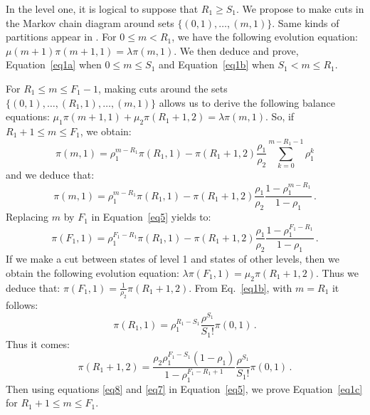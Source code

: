 \documentclass[conference]{IEEEtran}
\begin{document}
\begin{IEEEproof}
In the level one, it is logical to suppose that $R_1 \geq S_1$.
We propose to make cuts  in the Markov chain diagram around sets
$\{(0,1), \ldots, (m,1)\}$. Same kinds of partitions appear in \cite{mitrani2013managing}.
For $0 \leq m < R_1$, we have the following evolution equation: $\mu(m+1) \pi(m+1,1)= \lambda \pi(m,1)$.
We then deduce and prove, Equation~\eqref{eq1a} when $0 \leq m \leq S_1$ and
Equation~\eqref{eq1b} when $S_1<  m \leq R_1$.

For $R_1 \leq m \leq   F_1-1$, making cuts around the sets $\{(0,1), \ldots,(R_1,1), \ldots, (m,1)\}$ allows us to derive
the following balance equations: $\mu_1 \pi(m+1,1) + \mu_2 \pi(R_1+1,2)  = \lambda \pi(m,1)$. So, if $R_1+1 \leq m \leq   F_1$, we obtain:
\begin{equation}
\pi(m,1)=\rho_1^{m-R_1} \pi(R_1,1)-\pi(R_1+1,2)\frac{\rho_1}{\rho_2}\sum_{k=0}^{m-R_1-1} \rho_1^k \label{eq4}
\end{equation}
and we deduce that:
\begin{equation}
\pi(m,1)=\rho_1^{m-R_1} \pi(R_1,1)-\pi(R_1+1,2)\frac{\rho_1}{\rho_2}\frac{1-\rho_1^{m-R_1}}{1-\rho_1} \, .
\label{eq5}
\end{equation}
Replacing $m$ by $F_1$ in Equation~\eqref{eq5} yields to:
\begin{equation}
\pi(F_1,1)=\rho_1^{F_1-R_1} \pi(R_1,1)-\pi(R_1+1,2)\frac{\rho_1}{\rho_2}\frac{1-\rho_1^{F_1-R_1}}{1-\rho_1} \, .
\label{eq6}
\end{equation}
If we make a cut between states of level 1 and states of other levels, then we obtain the following evolution equation:
$\lambda \pi(F_1,1) = \mu_2 \pi(R_1+1,2)$. Thus  we deduce that:
$\pi(F_1,1)=\frac{1}{\rho_2} \pi(R_1+1,2)$. From Eq.~\eqref{eq1b}, with $m=R_1$ it follows:
\begin{equation}
\pi(R_1,1)=\rho_1^{R_1-S_1} \frac{\rho^{S_1}}{S_1!}\pi(0,1) \, .
\label{eq8}
\end{equation}
Thus it comes:
\begin{equation}
\pi(R_1+1,2)= \frac{\rho_2 \rho_1^{F_1-S_1} (1-\rho_1)} {1-\rho_1^{F_1-R_1+1}}  \frac{\rho^{S_1}}{S_1!}\pi(0,1) \, .
\label{eq7}
\end{equation}
Then using equations \eqref{eq8} and \eqref{eq7} in Equation~\eqref{eq5}, we prove Equation~\eqref{eq1c}
for $R_1+1 \leq m \leq  F_1$.
\end{IEEEproof}
\end{document}
